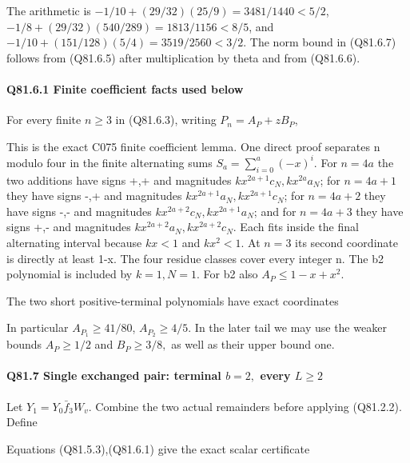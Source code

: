 The arithmetic is
\(-1/10+(29/32)(25/9)=3481/1440<5/2\),
\(-1/8+(29/32)(540/289)=1813/1156<8/5\), and
\(-1/10+(151/128)(5/4)=3519/2560<3/2\).
The norm bound in (Q81.6.7) follows from (Q81.6.5) after multiplication by
theta and from (Q81.6.6). 

\paragraph{Q81.6.1 Finite coefficient facts used below}

For every finite \(n\ge 3\) in (Q81.6.3), writing \(P_n=A_P+zB_P\),


This is the exact C075 finite coefficient lemma. One direct
proof separates n modulo four in the finite alternating sums
\(S_a=\sum_{i=0}^a(-x)^i\). For \(n=4a\) the two additions have signs
+,+ and magnitudes \(kx^{2a+1}c_N,\allowbreak  kx^{2a}a_N\); for \(n=4a+1\) they
have signs -,+ and magnitudes \(kx^{2a+1}a_N,\allowbreak  kx^{2a+1}c_N\);
for \(n=4a+2\) they have signs -,- and magnitudes
\(kx^{2a+2}c_N,\allowbreak  kx^{2a+1}a_N\); and for \(n=4a+3\) they have signs
+,- and magnitudes \(kx^{2a+2}a_N,\allowbreak  kx^{2a+2}c_N\).
Each fits inside the final alternating interval because \(kx<1\) and
\(kx^2<1.\) At \(n=3\) its second coordinate is directly at least 1-x.
The four residue classes cover every integer n. The b2 polynomial is included
by \(k=1,\allowbreak  N=1.\) For b2 also \(A_P\le1-x+x^2\).

The two short positive-terminal polynomials have exact coordinates


In particular \(A_{P_1}\ge41/80\), \(A_{P_2}\ge4/5\).
In the later tail we may use the weaker bounds \(A_P\ge 1/2\) and
\(B_P\ge 3/8,\allowbreak \) as well as their upper bound one.

\paragraph{Q81.7 Single exchanged pair: terminal \(b=2,\allowbreak \) every \(L\ge 2\)}

Let \(Y_1=Y_0\bar f_3W_v\). Combine the two actual remainders before
applying (Q81.2.2). Define


Equations (Q81.5.3),(Q81.6.1) give the exact scalar certificate

